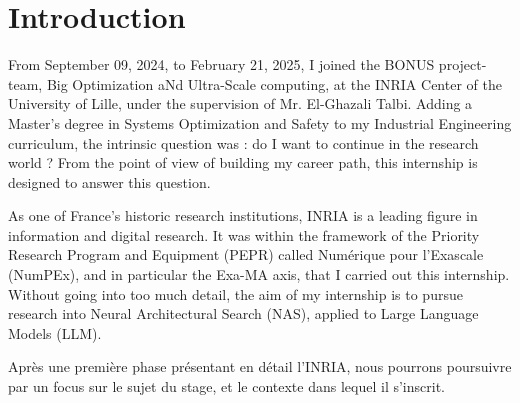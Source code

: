 \chapter*{Introduction}

From September 09, 2024, to February 21, 2025, I joined the BONUS project-team, Big Optimization aNd Ultra-Scale computing, at the INRIA Center of the University of Lille, under the supervision of Mr. El-Ghazali Talbi. Adding a Master's degree in Systems Optimization and Safety to my Industrial Engineering curriculum, the intrinsic question was : do I want to continue in the research world ? From the point of view of building my career path, this internship is designed to answer this question.


As one of France's historic research institutions, INRIA is a leading figure in information and digital research. It was within the framework of the Priority Research Program and Equipment (PEPR) called Numérique pour l'Exascale (NumPEx), and in particular the Exa-MA axis, that I carried out this internship. Without going into too much detail, the aim of my internship is to pursue research into Neural Architectural Search (NAS), applied to Large Language Models (LLM).


Après une première phase présentant en détail l'INRIA, nous pourrons poursuivre par un focus sur le sujet du stage, et le contexte dans lequel il s'inscrit. 


